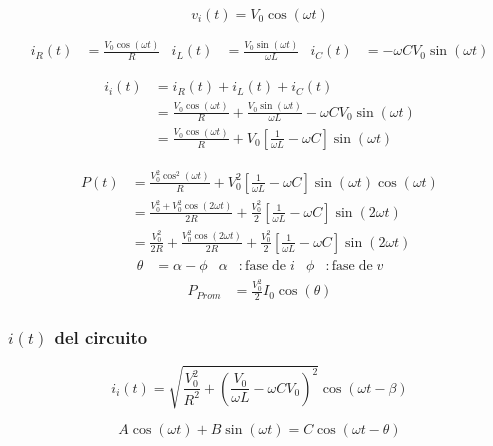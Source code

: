 \begin{equation*}
  v_i(t) = V_0 \cos(\omega t)
\end{equation*}

\begin{align*}
  i_R(t) &= \frac{V_0 \cos(\omega t)}{R} &
  i_L(t) &= \frac{V_0 \sin(\omega t)}{\omega L} &
  i_C(t) &= - \omega C V_0 \sin(\omega t)
\end{align*}

\begin{align*}
  i_i(t) &= i_R(t) + i_L(t) + i_C(t) \\
  &= \frac{V_0 \cos(\omega t)}{R} + \frac{V_0 \sin(\omega t)}{\omega L} - \omega C V_0 \sin(\omega t)\\
  &= \frac{V_0 \cos(\omega t)}{R} + V_0\left[\frac{1}{\omega L} - \omega C \right] \sin(\omega t)
\end{align*}

\begin{align*}
  P(t) &= \frac{V_0^2 \cos^{2}(\omega t)}{R} + V_0^2\left[\frac{1}{\omega L} - \omega C\right] \sin(\omega t) \cos(\omega t) \\
  &= \frac{V_0^2 + V_0^2 \cos(2 \omega t)}{2R} + \frac{V_0^2}{2} \left[\frac{1}{\omega L} - \omega C\right] \sin(2 \omega t)\\
  &= \frac{V_0^2}{2R} + \frac{V_0^2 \cos(2 \omega t)}{2R} + \frac{V_0^2}{2} \left[\frac{1}{\omega L} - \omega C\right] \sin(2 \omega t)
\end{align*}
\begin{align*}
  \theta &= \alpha - \phi &
  \alpha &: \mathrm{fase\mspace{5mu} de\mspace{5mu}} i &
  \phi &: \mathrm{fase\mspace{5mu} de\mspace{5mu}} v
\end{align*}
\begin{align*}
  P_{Prom} &= \frac{V_0^2}{2} I_0 \cos(\theta)
\end{align*}

\subsubsection*{$i(t)$ del circuito}

\begin{equation*}
  i_i(t) = \sqrt{\frac{V_0^2}{R^2} + \left(\frac{V_0}{\omega L} - \omega CV_0\right)^2} \cos(\omega t - \beta)
\end{equation*}

\begin{equation*}
  A \cos(\omega t) + B \sin(\omega t) = C \cos(\omega t - \theta)
\end{equation*}

